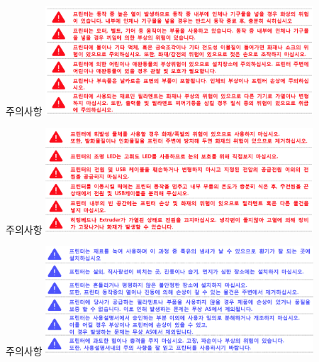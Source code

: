 \documentclass[11pt]{beamer}
\begin{document}

\begin{frame}[t]{주의사항}\footnotesize
	\includegraphics[width=10cm]{./image/18_02.png}
\end{frame}

\begin{frame}[t]{주의사항}\footnotesize
	\includegraphics[width=10cm]{./image/18_03.png}
\end{frame}

\begin{frame}[t]{주의사항}\footnotesize
	\includegraphics[width=10cm]{./image/18_04.png}
\end{frame}
\end{document}
